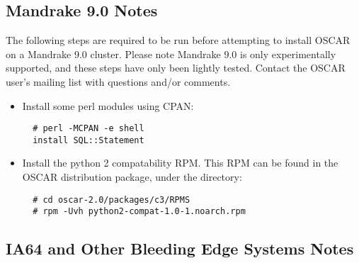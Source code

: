 
\subsection{Mandrake 9.0 Notes}
\label{subsec:mdk90notes}

The following steps are required to be run before attempting to
install OSCAR on a Mandrake 9.0 cluster.  Please note Mandrake 9.0 is
only experimentally supported, and these steps have only been lightly
tested.  Contact the OSCAR user's mailing list with questions and/or
comments.

\begin{itemize}
\item Install some perl modules using CPAN:

\begin{verbatim}
  # perl -MCPAN -e shell
  install SQL::Statement
\end{verbatim}
  
\item Install the python 2 compatability RPM.  This RPM can be found
  in the OSCAR distribution package, under the 
  directory:

\begin{verbatim}
  # cd oscar-2.0/packages/c3/RPMS
  # rpm -Uvh python2-compat-1.0-1.noarch.rpm
\end{verbatim}

\end{itemize}


\subsection{IA64 and Other Bleeding Edge Systems Notes}
\label{subsec:ia64notes}


